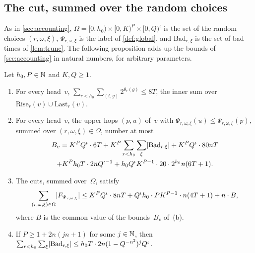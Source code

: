 \subsection{The cut, summed over the random choices}\label{sec:proof-total}

As in \cref{sec:accounting}, $\Omega=[0,h_0)\times[0,K)^P\times[0,Q)^\iota$ is the set of the random choices $(r,\omega,\xi)$,
$\Psi_{r,\omega,\xi}$ is the label of \cref{def:global}, and $\mathrm{Bad}_{r,\xi}$ is the set of bad times of \cref{lem:trunc}.
The following proposition adds up the bounds of \cref{sec:accounting} in natural numbers, for arbitrary parameters.

\begin{proposition}\label{prop:total}
Let $h_0,P\in\mathbb{N}$ and $K,Q\ge1$.
\begin{enumerate}[label=(\alph*)]
\item For every head~$v$, $\sum_{r<h_0}\sum_{(t,g)}2^{\theta_r(g)}\le8T$, the inner sum over
$\mathrm{Rise}_r(v)\cup\mathrm{Last}_r(v)$.
\item For every head~$v$, the upper hops $(p,u)$ of~$v$ with $\Psi_{r,\omega,\xi}(u)\le\Psi_{r,\omega,\xi}(p)$, summed over
$(r,\omega,\xi)\in\Omega$, number at most
\begin{multline*}
  B_v=K^PQ^\iota\cdot6T+K^P\sum_{r<h_0}\sum_\xi\lvert \mathrm{Bad}_{r,\xi} \rvert+K^PQ^\iota\cdot80nT\\
  +K^Ph_0T\cdot2nQ^{\iota-1}+h_0Q^\iota K^{P-1}\cdot20\cdot2^{h_0}n(6T+1).
\end{multline*}
\item The cuts, summed over~$\Omega$, satisfy
\[
  \sum_{(r,\omega,\xi)\in\Omega}\lvert F_{\Psi_{r,\omega,\xi}} \rvert\le K^PQ^\iota\cdot8nT+Q^\iota h_0\cdot PK^{P-1}\cdot n(4T+1)+n\cdot B,
\]
where $B$ is the common value of the bounds~$B_v$ of~(b).
\item If $P\ge1+2n(jn+1)$ for some $j\in\mathbb{N}$, then $\sum_{r<h_0}\sum_\xi\lvert \mathrm{Bad}_{r,\xi} \rvert\le h_0T\cdot2n(1-Q^{-n^2})^jQ^\iota$.
\end{enumerate}
\end{proposition}

